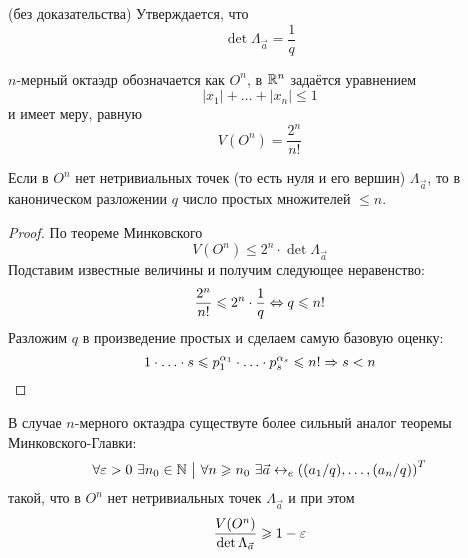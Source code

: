 \begin{theorem} (без доказательства)
	Утверждается, что
	\[
		\det \Lambda_{\vec{a}} = \frac{1}{q}
	\]
\end{theorem}

\begin{reminder}
	$n$-мерный октаэдр обозначается как $O^n$, в $\mathbb{R}^n$ задаётся уравнением
	\[
		|x_1| + \ldots + |x_n| \le 1
	\]
	и имеет меру, равную
	\[
		V(O^n) = \frac{2^n}{n!}
	\]
\end{reminder}

\begin{corollary}
	Если в $O^n$ нет нетривиальных точек (то есть нуля и его вершин) $\Lambda_{\vec{a}}$, то в каноническом разложении $q$ число простых множителей $\le n$.
\end{corollary}

\begin{proof}
	По теореме Минковского
	\[
		V(O^n) \le 2^n \cdot \det \Lambda_{\vec{a}}
	\]
	Подставим известные величины и получим следующее неравенство:
	\[
		\frac{2^n}{n!} \leqslant 2^n \cdot \frac{1}{q} \Leftrightarrow q \leqslant n!
	\]
	Разложим $q$ в произведение простых и сделаем самую базовую оценку:
	\[
		1 \cdot \ldots \cdot s \leqslant p_1^{\alpha_1} \cdot \ldots \cdot p_s^{\alpha_s} \leqslant n! \Rightarrow s < n
	\]
\end{proof}

\begin{theorem}
	В случае $n$-мерного октаэдра существуте более сильный аналог теоремы Минковского-Главки:
	\[
		\forall \varepsilon > 0\ \exists n_0 \in \mathbb{N} \ \big|\  \forall n \geqslant n_0\ \exists \vec{a} \leftrightarrow_e \left((a_1/q), \ldots, (a_n/q)\right)^T
	\]
	такой, что в $O^n$ нет нетривиальных точек $\Lambda_{\vec{a}}$ и при этом
	\[
		\frac{V(O^n)}{\det \Lambda_{\vec{a}}} \geqslant 1 - \varepsilon
	\]
\end{theorem}